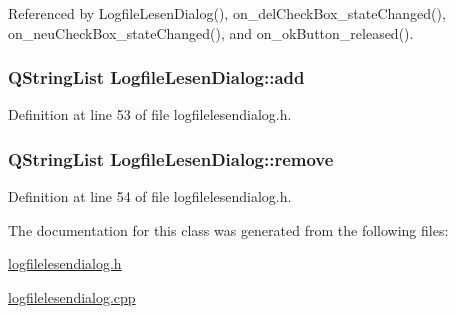 Referenced by LogfileLesenDialog(), on\_\-delCheckBox\_\-stateChanged(), on\_\-neuCheckBox\_\-stateChanged(), and on\_\-okButton\_\-released().\hypertarget{class_logfile_lesen_dialog_c600d0c7f2c2e328ecdbdae3fa12bee2}{
\subsubsection[add]{\setlength{\rightskip}{0pt plus 5cm}QStringList {\bf LogfileLesenDialog::add}}}
\label{class_logfile_lesen_dialog_c600d0c7f2c2e328ecdbdae3fa12bee2}




Definition at line 53 of file logfilelesendialog.h.\hypertarget{class_logfile_lesen_dialog_b6591a68eaf1f3c2e9b0a6422787df9d}{
\subsubsection[remove]{\setlength{\rightskip}{0pt plus 5cm}QStringList {\bf LogfileLesenDialog::remove}}}
\label{class_logfile_lesen_dialog_b6591a68eaf1f3c2e9b0a6422787df9d}




Definition at line 54 of file logfilelesendialog.h.

The documentation for this class was generated from the following files:\begin{CompactItemize}
\item 
\hyperlink{logfilelesendialog_8h}{logfilelesendialog.h}\item 
\hyperlink{logfilelesendialog_8cpp}{logfilelesendialog.cpp}\end{CompactItemize}
